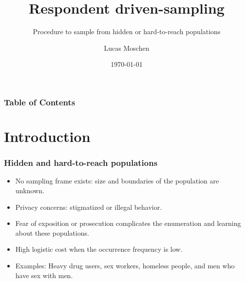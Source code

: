 \documentclass{beamer}
\title[Respondent driven-sampling]
{Respondent driven-sampling}
\subtitle{Procedure to sample from hidden or hard-to-reach populations}
\author[Lucas Moschen]
{Lucas Moschen}
\institute[EMAp/FGV]
{
  School of Applied Mathematics\\
  Fundação Getulio Vargas
}
\date[\today]
{\today}
\begin{document}
\frame{\titlepage}

\begin{frame}
\frametitle{Table of Contents}
\tableofcontents
\end{frame}

\section{Introduction}

\begin{frame}
\frametitle{Hidden and hard-to-reach populations}

\begin{itemize}
    \item No sampling frame exists: size and boundaries of the population are unknown.
    \item Privacy concerns: stigmatized or illegal behavior. 
    \item Fear of exposition or prosecution complicates the enumeration and learning about these populations.
    \item High logistic cost when the occurrence frequency is low.
    \item Examples: Heavy drug users, sex workers, homeless people, and men who have sex
    with men. 
\end{itemize}

\end{frame}
\end{document}
